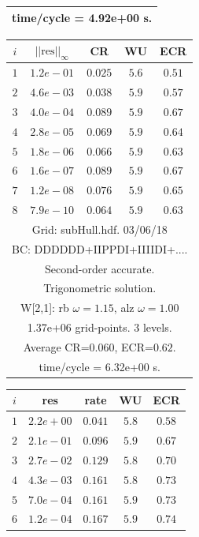 \begin{table}[hbt]
\begin{center}
{\begin{tabular}{|c|c|c|c|c|}
\multicolumn{5}{|c|}{time/cycle = 4.92e+00 s.}  \\
\hline 
\end{tabular}
\begin{tabular}{|c|c|c|c|c|} \hline 
 $i$   & $\vert\vert\mbox{res}\vert\vert_\infty$  &  CR     &  WU    & ECR  \\   \hline 
 $ 1$  & $ 1.2e-01$ & $0.025$ & $ 5.6$ & $0.51$ \\ 
 $ 2$  & $ 4.6e-03$ & $0.038$ & $ 5.9$ & $0.57$ \\ 
 $ 3$  & $ 4.0e-04$ & $0.089$ & $ 5.9$ & $0.67$ \\ 
 $ 4$  & $ 2.8e-05$ & $0.069$ & $ 5.9$ & $0.64$ \\ 
 $ 5$  & $ 1.8e-06$ & $0.066$ & $ 5.9$ & $0.63$ \\ 
 $ 6$  & $ 1.6e-07$ & $0.089$ & $ 5.9$ & $0.67$ \\ 
 $ 7$  & $ 1.2e-08$ & $0.076$ & $ 5.9$ & $0.65$ \\ 
 $ 8$  & $ 7.9e-10$ & $0.064$ & $ 5.9$ & $0.63$ \\ 
\hline 
\multicolumn{5}{|c|}{Grid: subHull.hdf. 03/06/18}  \\
\multicolumn{5}{|c|}{BC: DDDDDD+IIPPDI+IIIIDI+....}  \\
\multicolumn{5}{|c|}{Second-order accurate.}  \\
\multicolumn{5}{|c|}{Trigonometric solution.}  \\
\multicolumn{5}{|c|}{W[2,1]: rb $\omega=1.15$, alz $\omega=1.00$}  \\
\multicolumn{5}{|c|}{1.37e+06 grid-points. 3 levels.}  \\
\multicolumn{5}{|c|}{Average CR=$0.060$, ECR=$0.62$.}  \\
\multicolumn{5}{|c|}{time/cycle = 6.32e+00 s.}  \\
\hline 
\end{tabular}
\begin{tabular}{|c|c|c|c|c|} \hline 
 $i$   & res      & rate    &  WU    & ECR  \\   \hline 
 $ 1$  & $ 2.2e+00$ & $0.041$ & $ 5.8$ & $0.58$ \\ 
 $ 2$  & $ 2.1e-01$ & $0.096$ & $ 5.9$ & $0.67$ \\ 
 $ 3$  & $ 2.7e-02$ & $0.129$ & $ 5.8$ & $0.70$ \\ 
 $ 4$  & $ 4.3e-03$ & $0.161$ & $ 5.8$ & $0.73$ \\ 
 $ 5$  & $ 7.0e-04$ & $0.161$ & $ 5.9$ & $0.73$ \\ 
 $ 6$  & $ 1.2e-04$ & $0.167$ & $ 5.9$ & $0.74$ \\ 

\end{tabular}}
\end{center}
\end{table}
